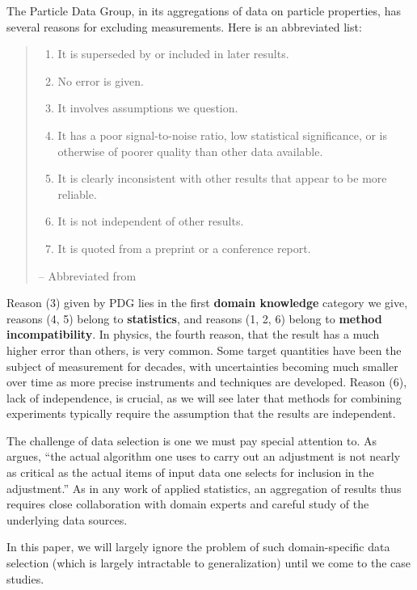 \documentclass[12pt]{article}
\begin{document}
The Particle Data Group, in its aggregations of data on particle properties, has several reasons for excluding measurements. Here is an abbreviated list:

\begin{quote}
  \begin{enumerate}
  \item It is superseded by or included in later results.
  \item No error is given.
  \item It involves assumptions we question.
  \item It has a poor signal-to-noise ratio, low statistical significance, or is otherwise of poorer quality than other data available.
  \item It is clearly inconsistent with other results that appear to be more reliable.
  \item It is not independent of other results.
  \item It is quoted from a preprint or a conference report.
  \end{enumerate} \hfill -- Abbreviated from \citet[Section 5.1]{navas2024review}
\end{quote}

Reason (3) given by PDG lies in the first \textbf{domain knowledge} category we give, reasons (4, 5) belong to \textbf{statistics}, and reasons (1, 2, 6) belong to \textbf{method incompatibility}. In physics, the fourth reason, that the result has a much higher error than others, is very common. Some target quantities have been the subject of measurement for decades, with uncertainties becoming much smaller over time as more precise instruments and techniques are developed. Reason (6), lack of independence, is crucial, as we will see later that methods for combining experiments typically require the assumption that the results are independent.

The challenge of data selection is one we must pay special attention to. As \citet{taylor1982numerical} argues, ``the actual algorithm one uses to carry out an adjustment is not nearly as critical as the actual items of input data one selects for inclusion in the adjustment.'' As in any work of applied statistics, an aggregation of results thus requires close collaboration with domain experts and careful study of the underlying data sources.

In this paper, we will largely ignore the problem of such domain-specific data selection (which is largely intractable to generalization) until we come to the case studies.
\end{document}
